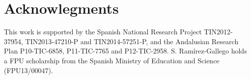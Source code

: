 \documentclass[preprint,12pt]{elsarticle}
\begin{document}
\begin{table}[!htp]
\renewcommand{\arraystretch}{1.3}
\centering
\scriptsize
\caption{Wilcoxon test results and average rankings of methods (Friedman Procedure \& Adjusted p-value with Holm's Test) for accuracy}
\label{tab:wilcoxon-disc}
\end{table}


\section*{Acknowlegments}

This work is supported by the Spanish National Research Project TIN2012-37954, TIN2013-47210-P and TIN2014-57251-P, and the Andalusian Research Plan P10-TIC-6858, P11-TIC-7765 and P12-TIC-2958. S. Ram\'irez-Gallego holds a FPU scholarship from the Spanish Ministry of Education and Science (FPU13/00047).



 



%
%
%
\end{document}
